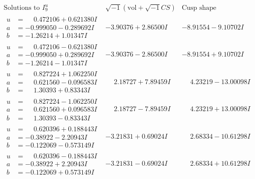 \documentclass[1p]{elsarticle_modified}
\theoremstyle{definition}
\newcommand{\I}{\sqrt{-1}}
\begin{document}
$$\begin{array}{c|c|c}  
\text{Solutions to }I^u_{9}& \I (\text{vol} + \sqrt{-1}CS) & \text{Cusp shape}\\
 \hline 
\begin{aligned}
u &= \phantom{-}0.472106 + 0.621380 I \\
a &= -0.999050 - 0.289692 I \\
b &= -1.26214 + 1.01347 I\end{aligned}
 & -3.90376 + 2.86500 I & -8.91554 - 9.10702 I \\ \hline\begin{aligned}
u &= \phantom{-}0.472106 - 0.621380 I \\
a &= -0.999050 + 0.289692 I \\
b &= -1.26214 - 1.01347 I\end{aligned}
 & -3.90376 - 2.86500 I & -8.91554 + 9.10702 I \\ \hline\begin{aligned}
u &= \phantom{-}0.827224 + 1.062250 I \\
a &= \phantom{-}0.621560 - 0.096583 I \\
b &= \phantom{-}1.30393 + 0.83343 I\end{aligned}
 & \phantom{-}2.18727 + 7.89459 I & \phantom{-}4.23219 - 13.00098 I \\ \hline\begin{aligned}
u &= \phantom{-}0.827224 - 1.062250 I \\
a &= \phantom{-}0.621560 + 0.096583 I \\
b &= \phantom{-}1.30393 - 0.83343 I\end{aligned}
 & \phantom{-}2.18727 - 7.89459 I & \phantom{-}4.23219 + 13.00098 I \\ \hline\begin{aligned}
u &= \phantom{-}0.620396 + 0.188443 I \\
a &= -0.38922 - 2.20943 I \\
b &= -0.122069 - 0.573149 I\end{aligned}
 & -3.21831 + 0.69024 I & \phantom{-}2.68334 - 10.61298 I \\ \hline\begin{aligned}
u &= \phantom{-}0.620396 - 0.188443 I \\
a &= -0.38922 + 2.20943 I \\
b &= -0.122069 + 0.573149 I\end{aligned}
 & -3.21831 - 0.69024 I & \phantom{-}2.68334 + 10.61298 I \\ \hline\begin{aligned}

\end{aligned}
\end{array}$$
\end{document}
